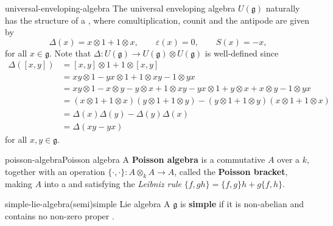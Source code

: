 \begin{example}{universal-enveloping-algebra}
    The universal enveloping algebra $U(\mathfrak{g})$ naturally has the structure of a , where comultiplication, counit and the antipode are given by
    \[ \Delta(x) = x \otimes 1 + 1 \otimes x, \qquad \varepsilon(x) = 0 , \qquad S(x) = -x , \]
    for all $x \in \mathfrak{g}$. Note that $\Delta : U(\mathfrak{g}) \to U(\mathfrak{g}) \otimes U(\mathfrak{g})$ is well-defined since
    \[ \begin{aligned}
        \Delta([x, y])
            &= [x, y] \otimes 1 + 1 \otimes [x, y] \\
            &= xy \otimes 1 - yx \otimes 1 + 1 \otimes xy - 1 \otimes yx \\
            &= xy \otimes 1 - x \otimes y - y \otimes x + 1 \otimes xy - yx \otimes 1 + y \otimes x + x \otimes y - 1 \otimes yx \\
            &= (x \otimes 1 + 1 \otimes x)(y \otimes 1 + 1 \otimes y) - (y \otimes 1 + 1 \otimes y)(x \otimes 1 + 1 \otimes x) \\
            &= \Delta(x) \Delta(y) - \Delta(y) \Delta(x) \\
            &= \Delta(xy - yx)
    \end{aligned} \]
    for all $x, y \in \mathfrak{g}$.
\end{example}

\begin{topic}{poisson-algebra}{Poisson algebra}
    A \textbf{Poisson algebra} is a commutative  $A$ over a  $k$, together with an operation $\{ \cdot, \cdot \} : A \otimes_k A \to A$, called the \textbf{Poisson bracket}, making $A$ into a  and satisfying the \textit{Leibniz rule} $\{ f, gh \} = \{ f, g \} h + g \{ f, h \}$. %
\end{topic}

\begin{topic}{simple-lie-algebra}{(semi)simple Lie algebra}
    A  $\mathfrak{g}$ is \textbf{simple} if it is non-abelian and contains no non-zero proper .
\end{topic}

